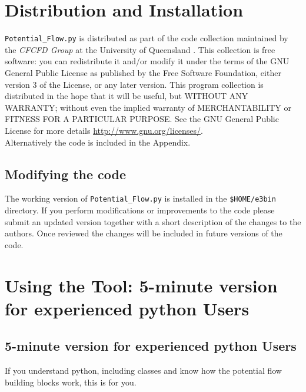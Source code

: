 \documentclass[10pt,a4paper]{article}
\begin{document}
\section{Distribution and Installation}
\verb'Potential_Flow.py' is distributed as part of the code collection maintained by the \emph{CFCFD Group} at the University of Queensland \citep{cfcfdpage:2015}. 
This collection is free software: you can redistribute it and/or modify it under the terms of the GNU General Public License as published by the Free Software Foundation, either version 3 of the License, or any later version. 
This program collection is distributed in the hope that it will be useful, but WITHOUT ANY WARRANTY; without even the implied warranty of MERCHANTABILITY or FITNESS FOR A PARTICULAR PURPOSE. 
See the GNU General Public License for more details \url{http://www.gnu.org/licenses/}.
\\
Alternatively the code is included in the Appendix.

\subsection{Modifying the code}
The working version of \verb'Potential_Flow.py' is installed in the \verb'$HOME/e3bin' directory.
If you perform modifications or improvements to the code please submit an updated version together with a short description of the changes to the authors.
Once reviewed the changes will be included in future versions of the code. 


\clearpage
\section{Using the Tool: 5-minute version for experienced python Users}

\subsection{5-minute version for experienced python Users}
If you understand python, including classes and know how the potential flow building blocks work, this is for you. 
\end{document}
